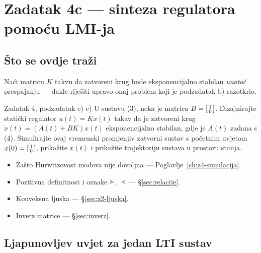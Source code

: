 \chapter{Zadatak 4c --- sinteza regulatora pomoću LMI-ja}
\label{ch:z4-lmi}

\section{Što se ovdje traži}

Naći matricu $K$ takvu da zatvoreni krug bude eksponencijalno stabilan
\emph{unatoč} prespajanju --- dakle riješiti upravo onaj problem koji je
podzadatak b) razotkrio.

\begin{zadatak}{Zadatak 4, podzadatak c)}
c) U sustavu (3), neka je matrica $B = \begin{bsmallmatrix} 1 \\ 0 \end{bsmallmatrix}$.
Dizajnirajte statički regulator $u(t) = Kx(t)$ takav da je zatvoreni krug
$\dot{x}(t) = (A(t) + BK)x(t)$ eksponencijalno stabilan, gdje je $A(t)$ zadana s
(4). Simulirajte ovaj vremenski promjenjiv zatvorni sustav s početnim uvjetom
$x(0) = \begin{bsmallmatrix} 1 \\ 0 \end{bsmallmatrix}$, prikažite $x(t)$ i
prikažite trajektoriju sustava u prostoru stanja.
\end{zadatak}

\begin{predznanje}
\begin{itemize}[nosep,leftmargin=*]
  \item Zašto Hurwitzovost modova nije dovoljna --- Poglavlje~\ref{ch:z4-simulacija}.
  \item Pozitivna definitnost i oznake $\succ$, $\prec$ --- \S\ref{sec:relacije}.
  \item Konveksna ljuska --- \S\ref{sec:z2-ljuska}.
  \item Inverz matrice --- \S\ref{sec:inverz}.
\end{itemize}
\end{predznanje}

\section{Ljapunovljev uvjet za jedan LTI sustav}
\label{sec:z4-ljapunov}

